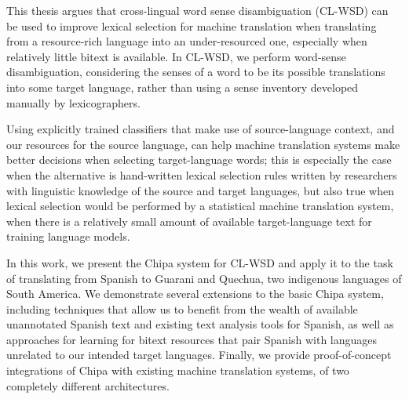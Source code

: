 This thesis argues that cross-lingual word sense disambiguation (CL-WSD) can be
used to improve lexical selection for machine translation when translating from
a resource-rich language into an under-resourced one, especially when relatively
little bitext is available.  In CL-WSD, we perform word-sense disambiguation,
considering the senses of a word to be its possible translations into some
target language, rather than using a sense inventory developed manually by
lexicographers.

Using explicitly trained classifiers that make use of source-language context,
and our resources for the source language, can help machine translation systems
make better decisions when selecting target-language words; this is especially
the case when the alternative is hand-written lexical selection rules written by
researchers with linguistic knowledge of the source and target languages, but
also true when lexical selection would be performed by a statistical machine
translation system, when there is a relatively small amount of available
target-language text for training language models.

In this work, we present the Chipa system for CL-WSD and apply it to the task of
translating from Spanish to Guarani and Quechua, two indigenous languages of
South America. We demonstrate several extensions to the basic Chipa system,
including techniques that allow us to benefit from the wealth of available
unannotated Spanish text and existing text analysis tools for Spanish, as well
as approaches for learning for bitext resources that pair Spanish with languages
unrelated to our intended target languages. Finally, we provide proof-of-concept
integrations of Chipa with existing machine translation systems, of two
completely different architectures.
